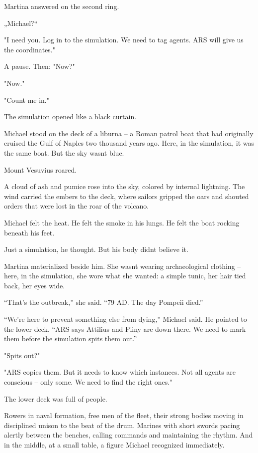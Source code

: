 \documentclass[
]{article}
\begin{document}
Martina answered on the second ring.

„Michael?{\kern0pt}``

"I need you. Log in to the simulation. We need to tag agents. ARS will give us the coordinates."

A pause. Then: "Now?"

"Now."

"Count me in."

The simulation opened like a black curtain.

Michael stood on the deck of a liburna -- a Roman patrol boat that had originally cruised the Gulf of Naples two thousand years ago. Here, in the simulation, it was the same boat. But the sky wasn\textquotesingle t blue.

Mount Vesuvius roared.

A cloud of ash and pumice rose into the sky, colored by internal lightning. The wind carried the embers to the deck, where sailors gripped the oars and shouted orders that were lost in the roar of the volcano.

Michael felt the heat. He felt the smoke in his lungs. He felt the boat rocking beneath his feet.

Just a simulation, he thought. But his body didn\textquotesingle t believe it.

Martina materialized beside him. She wasn\textquotesingle t wearing archaeological clothing -- here, in the simulation, she wore what she wanted: a simple tunic, her hair tied back, her eyes wide.

``That's the outbreak,'' she said. ``79 AD. The day Pompeii died.''

``We're here to prevent something else from dying,'' Michael said. He pointed to the lower deck. ``ARS says Attilius and Pliny are down there. We need to mark them before the simulation spits them out.''

"Spits out?"

"ARS copies them. But it needs to know which instances. Not all agents are conscious -- only some. We need to find the right ones."

The lower deck was full of people.

Rowers in naval formation, free men of the fleet, their strong bodies moving in disciplined unison to the beat of the drum. Marines with short swords pacing alertly between the benches, calling commands and maintaining the rhythm. And in the middle, at a small table, a figure Michael recognized immediately.
\end{document}
